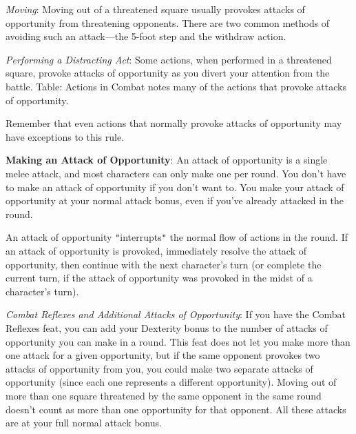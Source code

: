 \textit{Moving}: Moving out of a threatened square usually provokes attacks of opportunity from threatening opponents. There are two common methods of avoiding such an attack---the 5-foot step and the withdraw action.
				
\textit{Performing a Distracting Act}: Some actions, when performed in a threatened square, provoke attacks of opportunity as you divert your attention from the battle. Table: Actions in Combat notes many of the actions that provoke attacks of opportunity.
				
Remember that even actions that normally provoke attacks of opportunity may have exceptions to this rule.
				
\textbf{Making an Attack of Opportunity}: An attack of opportunity is a single melee attack, and most characters can only make one per round. You don't have to make an attack of opportunity if you don't want to. You make your attack of opportunity at your normal attack bonus, even if you've already attacked in the round.
				
An attack of opportunity \texttt{{}"{}}interrupts\texttt{{}"{}} the normal flow of actions in the round. If an attack of opportunity is provoked, immediately resolve the attack of opportunity, then continue with the next character's turn (or complete the current turn, if the attack of opportunity was provoked in the midst of a character's turn).
				
\textit{Combat Reflexes and Additional Attacks of Opportunity}: If you have the Combat Reflexes feat, you can add your Dexterity bonus to the number of attacks of opportunity you can make in a round. This feat does not let you make more than one attack for a given opportunity, but if the same opponent provokes two attacks of opportunity from you, you could make two separate attacks of opportunity (since each one represents a different opportunity). Moving out of more than one square threatened by the same opponent in the same round doesn't count as more than one opportunity for that opponent. All these attacks are at your full normal attack bonus.

